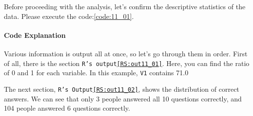 \documentclass{ltjsbook}
\begin{document}
Before proceeding with the analysis, let's confirm the descriptive statistics of the data. Please execute the code:\ref{code:11_01}.



\paragraph{Code Explanation}


Various information is output all at once, so let's go through them in order. First of all, there is the section \texttt{R's output\ref{RS:out11_01}}. Here, you can find the ratio of 0 and 1 for each variable. In this example, \texttt{V1} contains 71.0%


The next section, \texttt{R's Output\ref{RS:out11_02}}, shows the distribution of correct answers. We can see that only 3 people answered all 10 questions correctly, and 104 people answered 6 questions correctly.

\end{document}
